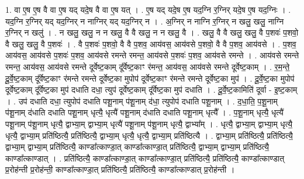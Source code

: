 \documentclass[17pt]{extarticle}
\begin{document}
1. वा ए॒ष ए॒ष वै वा ए॒ष यद् यदे॒ष वै वा ए॒ष यत् । . ए॒ष यद् यदे॒ष ए॒ष यद॒ग्नि र॒ग्निर् यदे॒ष ए॒ष यद॒ग्निः । . यद॒ग्नि र॒ग्निर् यद् यद॒ग्निर् न नाग्निर् यद् यद॒ग्निर् न । . अ॒ग्निर् न नाग्नि र॒ग्निर् न खलु॒ खलु॒ नाग्नि र॒ग्निर् न खलु॑ । . न खलु॒ खलु॒ न न खलु॒ वै वै खलु॒ न न खलु॒ वै । . खलु॒ वै वै खलु॒ खलु॒ वै प॒शवः॑ प॒शवो॒ वै खलु॒ खलु॒ वै प॒शवः॑ । . वै प॒शवः॑ प॒शवो॒ वै वै प॒शव॒ आय॑वस॒ आय॑वसे प॒शवो॒ वै वै प॒शव॒ आय॑वसे । . प॒शव॒ आय॑वस॒ आय॑वसे प॒शवः॑ प॒शव॒ आय॑वसे रमन्ते रमन्त॒ आय॑वसे प॒शवः॑ प॒शव॒ आय॑वसे रमन्ते । . आय॑वसे रमन्ते रमन्त॒ आय॑वस॒ आय॑वसे रमन्ते दूर्वेष्ट॒काम् दू᳚र्वेष्ट॒काꣳ र॑मन्त॒ आय॑वस॒ आय॑वसे रमन्ते दूर्वेष्ट॒काम् । . र॒म॒न्ते॒ दू॒र्वे॒ष्ट॒काम् दू᳚र्वेष्ट॒काꣳ र॑मन्ते रमन्ते दूर्वेष्ट॒का मुपोप॑ दूर्वेष्ट॒काꣳ र॑मन्ते रमन्ते दूर्वेष्ट॒का मुप॑ । . दू॒र्वे॒ष्ट॒का मुपोप॑ दूर्वेष्ट॒काम् दू᳚र्वेष्ट॒का मुप॑ दधाति दधा॒ त्युप॑ दूर्वेष्ट॒काम् दू᳚र्वेष्ट॒का मुप॑ दधाति । . दू॒र्वे॒ष्ट॒कामिति॑ दूर्वा - इ॒ष्ट॒काम् । . उप॑ दधाति दधा॒ त्युपोप॑ दधाति पशू॒नाम् प॑शू॒नाम् द॑धा॒ त्युपोप॑ दधाति पशू॒नाम् । . द॒धा॒ति॒ प॒शू॒नाम् प॑शू॒नाम् द॑धाति दधाति पशू॒नाम् धृत्यै॒ धृत्यै॑ पशू॒नाम् द॑धाति दधाति पशू॒नाम् धृत्यै᳚ । . प॒शू॒नाम् धृत्यै॒ धृत्यै॑ पशू॒नाम् प॑शू॒नाम् धृत्यै॒ द्वाभ्या॒म् द्वाभ्या॒म् धृत्यै॑ पशू॒नाम् प॑शू॒नाम् धृत्यै॒ द्वाभ्या᳚म् । . धृत्यै॒ द्वाभ्या॒म् द्वाभ्या॒म् धृत्यै॒ धृत्यै॒ द्वाभ्या॒म् प्रति॑ष्ठित्यै॒ प्रति॑ष्ठित्यै॒ द्वाभ्या॒म् धृत्यै॒ धृत्यै॒ द्वाभ्या॒म् प्रति॑ष्ठित्यै । . द्वाभ्या॒म् प्रति॑ष्ठित्यै॒ प्रति॑ष्ठित्यै॒ द्वाभ्या॒म् द्वाभ्या॒म् प्रति॑ष्ठित्यै॒ काण्डा᳚त्काण्डा॒त् काण्डा᳚त्काण्डा॒त् प्रति॑ष्ठित्यै॒ द्वाभ्या॒म् द्वाभ्या॒म् प्रति॑ष्ठित्यै॒ काण्डा᳚त्काण्डात् । . प्रति॑ष्ठित्यै॒ काण्डा᳚त्काण्डा॒त् काण्डा᳚त्काण्डा॒त् प्रति॑ष्ठित्यै॒ प्रति॑ष्ठित्यै॒ काण्डा᳚त्काण्डात् प्र॒रोह॑न्ती प्र॒रोह॑न्ती॒ काण्डा᳚त्काण्डा॒त् प्रति॑ष्ठित्यै॒ प्रति॑ष्ठित्यै॒ काण्डा᳚त्काण्डात् प्र॒रोह॑न्ती । \newline
\end{document}
